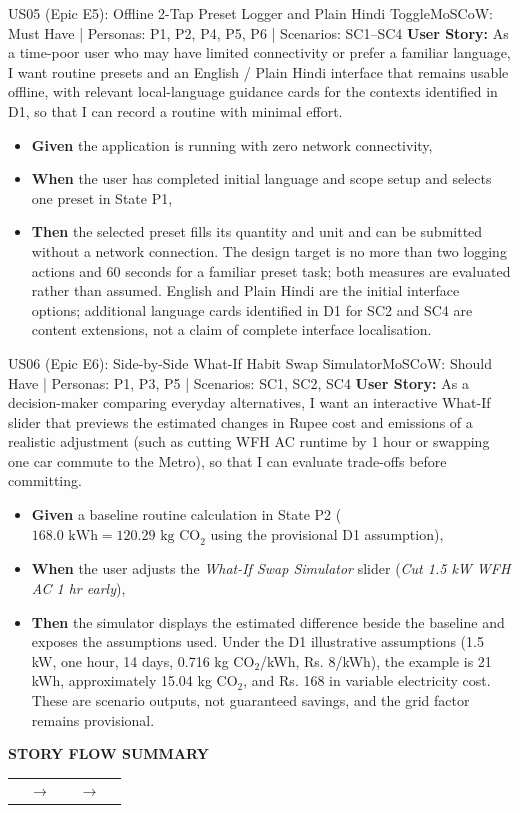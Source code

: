 \documentclass[12pt,a4paper]{article}
\makeatletter
\renewcommand{\arraystretch}{1.38}
\newcommand{\storyflow}[3]{%
  \par\Needspace{5\baselineskip}\vspace{0.08cm}%
  \begin{tcolorbox}[
    enhanced,width=\linewidth,
    colback=RowGray!72,colframe=RuleGray,
    boxrule=0.5pt,arc=1.2mm,
    borderline west={2pt}{0pt}{Teal},
    left=9pt,right=9pt,top=9pt,bottom=9pt,
    before skip=0pt,after skip=0pt
  ]
    {\sffamily\footnotesize\bfseries\color{Teal}STORY FLOW SUMMARY}\par
    \vspace{0.18cm}
    \renewcommand{\arraystretch}{1.0}%
    \begin{tabularx}{\linewidth}{@{}>{\centering\arraybackslash}X
      >{\centering\arraybackslash}p{0.52cm}
      >{\centering\arraybackslash}X
      >{\centering\arraybackslash}p{0.52cm}
      >{\centering\arraybackslash}X@{}}
      \fcolorbox{Teal!42}{white}{%
        \parbox[c][1.65cm][c]{\dimexpr\hsize-2\fboxsep-2\fboxrule\relax}{%
          \centering\sffamily\small\bfseries\color{Teal}01\par
          \vspace{3pt}\normalfont\small\color{Navy}#1}} &
      {\color{Teal}\normalsize$\to$} &
      \fcolorbox{Teal!42}{white}{%
        \parbox[c][1.65cm][c]{\dimexpr\hsize-2\fboxsep-2\fboxrule\relax}{%
          \centering\sffamily\small\bfseries\color{Teal}02\par
          \vspace{3pt}\normalfont\small\color{Navy}#2}} &
      {\color{Teal}\normalsize$\to$} &
      \fcolorbox{Teal!42}{white}{%
        \parbox[c][1.65cm][c]{\dimexpr\hsize-2\fboxsep-2\fboxrule\relax}{%
          \centering\sffamily\small\bfseries\color{Teal}03\par
          \vspace{3pt}\normalfont\small\color{Navy}#3}}
    \end{tabularx}
  \end{tcolorbox}
  \vspace{0.08cm}%
}
\makeatother
\begin{document}
\clearpage
\Needspace{0.30\textheight}
\begin{storybox}{US05 (Epic E5): Offline 2-Tap Preset Logger and Plain Hindi Toggle}{MoSCoW: Must Have | Personas: P1, P2, P4, P5, P6 | Scenarios: SC1--SC4}
\textbf{User Story:} As a time-poor user who may have limited connectivity or prefer a familiar language, I want routine presets and an English / Plain Hindi interface that remains usable offline, with relevant local-language guidance cards for the contexts identified in D1, so that I can record a routine with minimal effort.
\begin{itemize}
    \item \textbf{Given} the application is running with zero network connectivity,
    \item \textbf{When} the user has completed initial language and scope setup and selects one preset in State P1,
    \item \textbf{Then} the selected preset fills its quantity and unit and can be submitted without a network connection. The design target is no more than two logging actions and 60 seconds for a familiar preset task; both measures are evaluated rather than assumed. English and Plain Hindi are the initial interface options; additional language cards identified in D1 for SC2 and SC4 are content extensions, not a claim of complete interface localisation.
\end{itemize}
\end{storybox}

\vspace{0.28cm}

\Needspace{0.30\textheight}
\begin{storybox}{US06 (Epic E6): Side-by-Side What-If Habit Swap Simulator}{MoSCoW: Should Have | Personas: P1, P3, P5 | Scenarios: SC1, SC2, SC4}
\textbf{User Story:} As a decision-maker comparing everyday alternatives, I want an interactive What-If slider that previews the estimated changes in Rupee cost and emissions of a realistic adjustment (such as cutting WFH AC runtime by 1 hour or swapping one car commute to the Metro), so that I can evaluate trade-offs before committing.
\begin{itemize}
    \item \textbf{Given} a baseline routine calculation in State P2 ($168.0\text{ kWh} = 120.29\text{ kg CO}_2$ using the provisional D1 assumption),
    \item \textbf{When} the user adjusts the \textit{What-If Swap Simulator} slider (\textit{Cut 1.5 kW WFH AC 1 hr early}),
    \item \textbf{Then} the simulator displays the estimated difference beside the baseline and exposes the assumptions used. Under the D1 illustrative assumptions (1.5 kW, one hour, 14 days, 0.716 kg CO$_2$/kWh, Rs. 8/kWh), the example is 21 kWh, approximately 15.04 kg CO$_2$, and Rs. 168 in variable electricity cost. These are scenario outputs, not guaranteed savings, and the grid factor remains provisional.
\end{itemize}
\end{storybox}
\storyflow{Choose offline preset}{Fill quantity and unit}{Submit without network}
\end{document}
